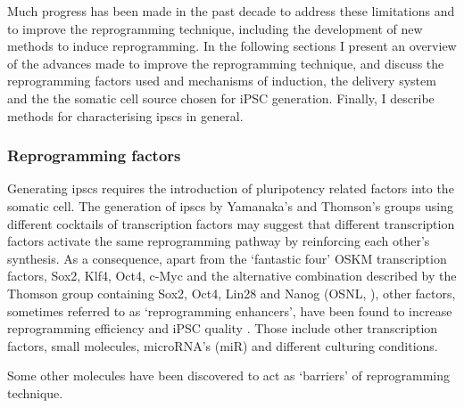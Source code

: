 Much progress has been made in the past decade to address these limitations and to improve the reprogramming technique, including the development of new methods to induce reprogramming. 
In the following sections I present an overview of the advances made to improve the reprogramming technique, and discuss the reprogramming factors used and mechanisms of induction, the delivery system and the the somatic cell source chosen for iPSC generation.
Finally, I describe methods for characterising \glspl{ipsc} in general. 
\subsubsection{Reprogramming factors}

Generating \glspl{ipsc} requires the introduction of pluripotency related factors into the somatic cell. 
The generation of \glspl{ipsc} by Yamanaka’s and Thomson’s groups using different cocktails of transcription factors may suggest that different transcription factors activate the same reprogramming pathway by reinforcing each other’s synthesis.
As a consequence, apart from the `fantastic four' OSKM transcription factors, Sox2, Klf4, Oct4, c-Myc and the alternative combination described by the Thomson group containing Sox2, Oct4, Lin28 and Nanog (OSNL, \cite{yu2007induced}), other factors, sometimes referred to as `reprogramming enhancers', have been found to increase reprogramming efficiency and iPSC quality \cite{takahashi2016decade}.
Those include other transcription factors, small molecules, microRNA’s (miR) and different culturing conditions. 




Some other molecules have been discovered to act as `barriers' of reprogramming technique. 

